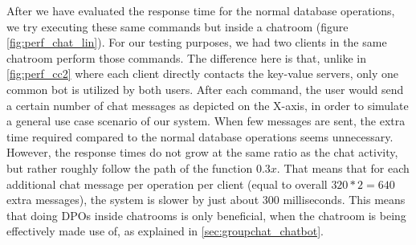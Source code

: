 After we have evaluated the response time for the normal database operations, we try executing these same commands but inside a chatroom (figure \ref{fig:perf_chat_lin}). For our testing purposes, we had two clients in the same chatroom perform those commands. The difference here is that, unlike in \ref{fig:perf_cc2} where each client directly contacts the key-value servers, only one common bot is utilized by both users. After each command, the user would send a certain number of chat messages as depicted on the X-axis, in order to simulate a general use case scenario of our system.
When few messages are sent, the extra time required compared to the normal database operations seems unnecessary. 
However, the response times do not grow at the same ratio as the chat activity, but rather roughly follow the path of the function \begin{math}0.3x\end{math}. That means that for each additional chat message per operation per client (equal to overall \begin{math}320 * 2 = 640\end{math} extra messages), the system is slower by just about 300 milliseconds. This means that doing DPOs inside chatrooms is only beneficial, when the chatroom is being effectively made use of, as explained in \ref{sec:groupchat_chatbot}.